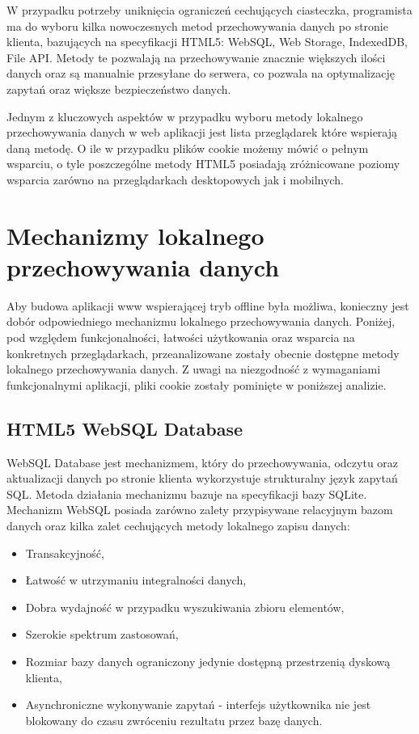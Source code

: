 W przypadku potrzeby uniknięcia ograniczeń cechujących ciasteczka, programista ma do wyboru kilka nowoczesnych metod przechowywania danych po stronie klienta, bazujących na specyfikacji HTML5: WebSQL, Web Storage, IndexedDB, File API. Metody te pozwalają na przechowywanie znacznie większych ilości danych oraz są manualnie przesyłane do serwera, co pozwala na optymalizację zapytań oraz większe bezpieczeństwo danych.

Jednym z kluczowych aspektów w przypadku wyboru metody lokalnego przechowywania danych w web aplikacji jest lista przeglądarek które wspierają daną metodę. O ile w przypadku plików cookie możemy mówić o pełnym wsparciu, o tyle poszczególne metody HTML5 posiadają zróżnicowane poziomy wsparcia zarówno na przeglądarkach desktopowych jak i mobilnych.

\section{Mechanizmy lokalnego przechowywania danych}
\label{sec:mechLokPrzechDanych}

Aby budowa aplikacji www wspierającej tryb offline była możliwa, konieczny jest dobór odpowiedniego mechanizmu lokalnego przechowywania danych. Poniżej, pod względem funkcjonalności, łatwości użytkowania oraz wsparcia na konkretnych przeglądarkach, przeanalizowane zostały obecnie dostępne metody lokalnego przechowywania danych. Z uwagi na niezgodność z wymaganiami funkcjonalnymi aplikacji,  pliki cookie zostały pominięte w poniższej analizie.

\subsection{HTML5 WebSQL Database}
\label{sec:html5WebSqlDatabase}

WebSQL Database\cite{webSqlDb} jest mechanizmem, który do przechowywania, odczytu oraz aktualizacji danych po stronie klienta wykorzystuje strukturalny język zapytań SQL. Metoda działania mechanizmu bazuje na specyfikacji bazy SQLite. Mechanizm WebSQL posiada zarówno zalety przypisywane relacyjnym bazom danych oraz kilka zalet cechujących metody lokalnego zapisu danych:

\begin{itemize}
\item Transakcyjność,
\item Łatwość w utrzymaniu integralności danych,
\item Dobra wydajność w przypadku wyszukiwania zbioru elementów,
\item Szerokie spektrum zastosowań,
\item Rozmiar bazy danych ograniczony jedynie dostępną przestrzenią dyskową klienta,
\item Asynchroniczne wykonywanie zapytań - interfejs użytkownika nie jest blokowany do czasu zwróceniu rezultatu przez bazę danych.
\end{itemize}

